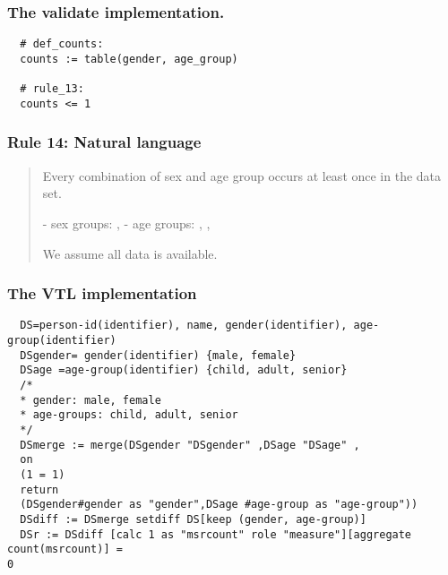 \subsubsection*{The validate implementation.}
\begin{verbatim}
  # def_counts:
  counts := table(gender, age_group)

  # rule_13:
  counts <= 1
\end{verbatim}


\newpage

\subsubsection*{  Rule 14: Natural language}
\begin{quote}


Every combination of sex and age group occurs at least once in the data set.

- sex groups: , 
- age groups: , ,  

We assume all data is available.


\end{quote}
\subsubsection*{The VTL implementation}
\begin{verbatim}
  DS=person-id(identifier), name, gender(identifier), age-group(identifier)
  DSgender= gender(identifier) {male, female}
  DSage =age-group(identifier) {child, adult, senior}
  /*
  * gender: male, female
  * age-groups: child, adult, senior
  */
  DSmerge := merge(DSgender "DSgender" ,DSage "DSage" ,
  on
  (1 = 1)
  return
  (DSgender#gender as "gender",DSage #age-group as "age-group"))
  DSdiff := DSmerge setdiff DS[keep (gender, age-group)]
  DSr := DSdiff [calc 1 as "msrcount" role "measure"][aggregate count(msrcount)] =
0
\end{verbatim}
